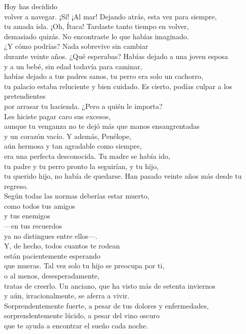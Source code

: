 \begin{versopropio}
Hoy has decidido\\
volver a navegar.
\stanzabreak
¡Sí! ¡Al mar! Dejando atrás, esta vez para siempre,\\
tu amada isla.
\stanzabreak
¡Oh, Ítaca! Tardaste tanto tiempo en volver,\\
demasiado quizás. No encontraste lo que habías imaginado.\\
¿Y cómo podrías? Nada sobrevive sin cambiar\\
durante veinte años.
\stanzabreak
¿Qué esperabas? Habías dejado a una joven esposa\\
y a un bebé, sin edad todavía para caminar,\\
habías dejado a tus padres sanos, tu perro era solo un cachorro,\\
tu palacio estaba reluciente y bien cuidado.
\stanzabreak
Es cierto, podías culpar a los pretendientes\\
por arrasar tu hacienda. ¿Pero a quién le importa?\\
Les hiciste pagar caro sus excesos,\\
aunque tu venganza no te dejó más que manos ensangrentadas\\
y un corazón vacío. Y además, Penélope,\\
aún hermosa y tan agradable como siempre,\\
era una perfecta desconocida. Tu madre se había ido,\\
tu padre y tu perro pronto la seguirían, y tu hijo,\\
tu querido hijo, no había de quedarse.
\stanzabreak
Han pasado veinte años más desde tu regreso.\\
Según todas las normas deberías estar muerto,\\
como todos tus amigos\\
y tus enemigos\\
---en tus recuerdos\\
ya no distingues entre ellos---.\\
Y, de hecho, todos cuantos te rodean\\
están pacientemente esperando\\
que mueras. Tal vez solo tu hijo se preocupa por ti,\\
o al menos, desesperadamente,\\
tratas de creerlo.
\stanzabreak
Un anciano, que ha visto más de setenta inviernos\\
y aún, irracionalmente, se aferra a vivir.\\
Sorprendentemente fuerte, a pesar de tus dolores y enfermedades,\\
sorprendentemente lúcido, a pesar del vino oscuro\\
que te ayuda a encontrar el sueño cada noche.
\end{versopropio}

